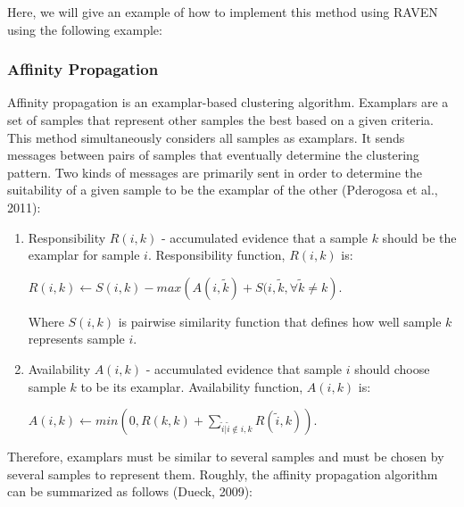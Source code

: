 \documentclass[11pt]{article}
\begin{document}
Here, we will give an example of how to implement this method using RAVEN using the following example:



\subsubsection{Affinity Propagation}

Affinity propagation is an examplar-based clustering algorithm. Examplars are a set of samples that represent other samples the best based on a given criteria. This method simultaneously considers all samples as examplars. It sends messages between pairs of samples that eventually determine the clustering pattern. Two kinds of messages are primarily sent in order to determine the suitability of a given sample to be the examplar of the other (Pderogosa et al., 2011):

\begin{enumerate}

\item Responsibility $R(i, k)$ - accumulated evidence that a sample $k$ should be the examplar for sample $i$. Responsibility function, $R(i, k)$ is:

\begin{center}

$R(i, k) \leftarrow S(i, k) - max\left(A(i, \tilde{k}) + S(i, \tilde{k}, \forall \tilde{k} \neq k \right).$

\end{center}

Where $S(i, k)$ is pairwise similarity function that defines how well sample $k$ represents sample $i$.

\item Availability $A(i, k)$ - accumulated evidence that sample $i$ should choose sample $k$ to be its examplar. Availability function, $A(i, k)$ is:

\begin{center}
$A(i, k) \leftarrow min \left(0, R(k, k) + \sum_{\tilde{i} | \tilde{i}  \notin {i, k}} R(\tilde{i}, k) \right).$
\end{center}


\end{enumerate}

Therefore, examplars must be similar to several samples and must be chosen by several samples to represent them. Roughly, the affinity propagation algorithm can be summarized as follows (Dueck, 2009):
\end{document}
